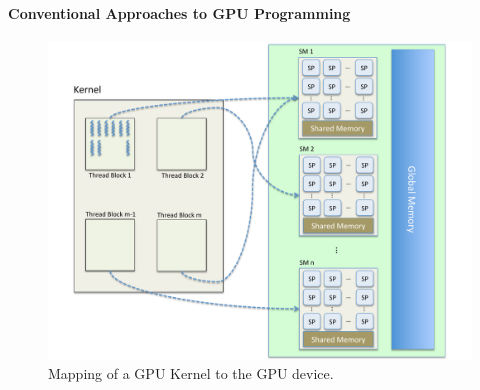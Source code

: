 \documentclass[final]{jfp1}
\begin{document}
\paragraph{Conventional Approaches to GPU Programming}


\begin{figure}[t]
\begin{center}
\includegraphics[width=0.9\linewidth]{figures/GPU-Kernel-Mapping.pdf}
\caption{Mapping of a GPU Kernel to the GPU device.}
\label{fig:GPU}
\end{center}
\end{figure}
\end{document}
